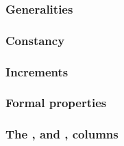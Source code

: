 \subsubsection{Generalities                                                              \lispTodo{}}    \label{hub: system: hub stamp: generalities}                 
\subsubsection{Constancy                                                                 \lispTodo{}}    \label{hub: system: hub stamp: constancy}                    
\subsubsection{Increments                                                                \lispTodo{}}    \label{hub: system: hub stamp: increments}                   
\subsubsection{Formal properties                                                         \lispTodo{}}    \label{hub: system: hub stamp: formal properties}            
\subsubsection{The \tli, \tliCounter{} and \nonStackRows, \nonStackRowsCounter{} columns \lispTodo{}}    \label{hub: system: hub stamp: counters}                     
